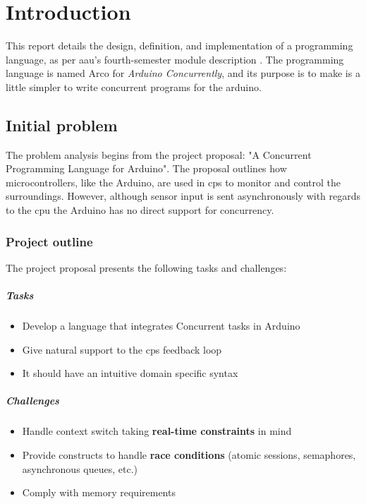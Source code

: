 \chapter{Introduction}\label{cha:introduction}
This report details the design, definition, and implementation of a programming language, as per \gls{aau}'s fourth-semester module description \cite{AAU_Modules_P4}. The programming language is named Arco for \textit{Arduino Concurrently}, and its purpose is to make is a little simpler to write concurrent programs for the arduino.

\section{Initial problem}\label{sec:initialproblem}
The problem analysis begins from the project proposal: "A Concurrent Programming Language for Arduino". The proposal outlines how microcontrollers, like the Arduino, are used in \gls{cps} to monitor and control the surroundings. However, although sensor input is sent asynchronously with regards to the \gls{cpu} the Arduino has no direct support for concurrency.

\subsection{Project outline}
The project proposal presents the following tasks and challenges:

\paragraph{Tasks}
\begin{itemize}
    \item Develop a language that integrates Concurrent tasks in Arduino
    \item Give natural support to the \gls{cps} feedback loop
    \item It should have an intuitive domain specific syntax
\end{itemize}

\paragraph{Challenges}
\begin{itemize}
    \item Handle context switch taking \textbf{real-time constraints} in mind
    \item Provide constructs to handle \textbf{race conditions} (atomic sessions, semaphores, asynchronous queues, etc.)
    \item Comply with memory requirements
\end{itemize}


